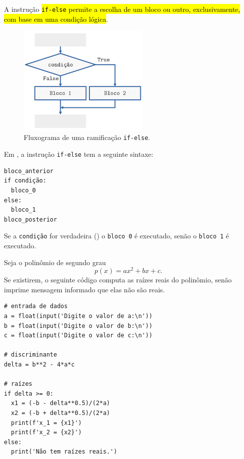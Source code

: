 A instrução \hl{\texttt{if-else} permite a escolha de um bloco ou outro, exclusivamente, com base em uma condição lógica}.

\begin{figure}[H]
  \centering
  \includegraphics[width=2.5in]{./cap_progest/dados/fig_fg_else/fig.png}
  \caption{Fluxograma de uma ramificação \lstinline+if-else+.}
  \label{cap_progest_sec_ramifica:fig:fg_else}
\end{figure}

Em {\python}, a instrução \lstinline+if-else+ tem a seguinte sintaxe:

\begin{lstlisting}
bloco_anterior
if condição:
  bloco_0
else:
  bloco_1
bloco_posterior
\end{lstlisting}

Se a {\lstinline+condição+} for verdadeira ({\PYTHONTrue}) o {\lstinline+bloco 0+} é executado, senão o {\lstinline+bloco 1+} é executado.

\begin{ex}
  Seja o polinômio de segundo grau
  \begin{equation}
    p(x) = ax^2 + bx + c.
  \end{equation}
  Se existirem, o seguinte código computa as raízes reais do polinômio, senão imprime mensagem informado que elas não são reais.

\begin{lstlisting}
# entrada de dados
a = float(input('Digite o valor de a:\n'))
b = float(input('Digite o valor de b:\n'))
c = float(input('Digite o valor de c:\n'))

# discriminante
delta = b**2 - 4*a*c

# raízes
if delta >= 0:
  x1 = (-b - delta**0.5)/(2*a)
  x2 = (-b + delta**0.5)/(2*a)
  print(f'x_1 = {x1}')
  print(f'x_2 = {x2}')
else:
  print('Não tem raízes reais.')
\end{lstlisting}

\end{ex}

